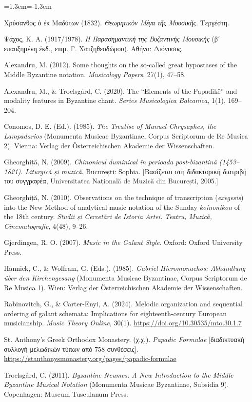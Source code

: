 \documentclass[a4paper]{article}
\newenvironment{reflist}{\begin{list}{}{\leftmargin=1.3em\itemindent=-1.3em\itemsep=0pt\parsep=0pt}\fontsize{9}{9.5}\selectfont}{\end{list}}
\begin{document}
\begin{reflist}
\item Χρύσανθος ὁ ἐκ Μαδύτων (1832). \emph{Θεωρητικὸν Μέγα τῆς Μουσικῆς}. Τεργέστη.
\item Ψάχος, Κ. Α. (1917/1978). \emph{Η Παρασημαντική της Βυζαντινής Μουσικής} (β΄ επαυξημένη έκδ., επιμ. Γ. Χατζηθεοδώρου). Αθήνα: Διόνυσος.
\item Alexandru, M. (2012). Some thoughts on the so-called great hypostases of the Middle Byzantine notation. \emph{Musicology Papers}, 27(1), 47--58.
\item Alexandru, M., \& Troelsgård, C. (2020). The “Elements of the Papadikê” and modality features in Byzantine chant. \emph{Series Musicologica Balcanica}, 1(1), 169--204.
\item Conomos, D. E. (Ed.). (1985). \emph{The Treatise of Manuel Chrysaphes, the Lampadarios} (Monumenta Musicae Byzantinae, Corpus Scriptorum de Re Musica 2). Vienna: Verlag der Österreichischen Akademie der Wissenschaften.
\item Gheorghiță, N. (2009). \emph{Chinonicul duminical în perioada post-bizantină (1453--1821). Liturgică și muzică}. București: Sophia. [Βασίζεται στη διδακτορική διατριβή του συγγραφέα, Universitatea Națională de Muzică din București, 2005.]
\item Gheorghiță, N. (2010). Observations on the technique of transcription (\emph{exegesis}) into the New Method of analytical music notation of the Sunday \emph{koinonikon} of the 18th century. \emph{Studii și Cercetări de Istoria Artei. Teatru, Muzică, Cinematografie}, 4(48), 9--26.
\item Gjerdingen, R. O. (2007). \emph{Music in the Galant Style}. Oxford: Oxford University Press.
\item Hannick, C., \& Wolfram, G. (Eds.). (1985). \emph{Gabriel Hieromonachos: Abhandlung über den Kirchengesang} (Monumenta Musicae Byzantinae, Corpus Scriptorum de Re Musica 1). Wien: Verlag der Österreichischen Akademie der Wissenschaften.
\item Rabinovitch, G., \& Carter-Enyi, A. (2024). Melodic organization and sequential ordering of galant schemata: Implications for eighteenth-century European musicianship. \emph{Music Theory Online}, 30(1). \url{https://doi.org/10.30535/mto.30.1.7}
\item St. Anthony’s Greek Orthodox Monastery. (χ.χ.). \emph{Papadic Formulae} [διαδικτυακή συλλογή μελωδικών τύπων από 758 συνθέσεις]. \url{https://stanthonysmonastery.org/pages/papadic-formulae}
\item Troelsgård, C. (2011). \emph{Byzantine Neumes: A New Introduction to the Middle Byzantine Musical Notation} (Monumenta Musicae Byzantinae, Subsidia 9). Copenhagen: Museum Tusculanum Press.
\end{reflist}
\end{document}
